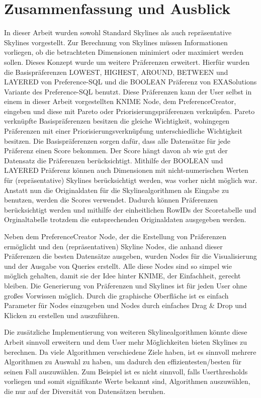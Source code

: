 \chapter{Zusammenfassung und Ausblick}
\label{ch:Zusammenfassung}
In dieser Arbeit wurden sowohl Standard Skylines als auch repräsentative Skylines vorgestellt. Zur Berechnung von Skylines müssen Informationen vorliegen, ob die betrachteten Dimensionen minimiert oder maximiert werden sollen. Dieses Konzept wurde um weitere Präferenzen erweitert. Hierfür wurden die Basispräferenzen LOWEST, HIGHEST, AROUND, BETWEEN und LAYERED von Preference-SQL und die BOOLEAN Präferenz von EXASolutions Variante des Preference-SQL benutzt. 
Diese Präferenzen kann der User selbst in einem in dieser Arbeit vorgestellten KNIME Node, dem PreferenceCreator, eingeben und diese mit Pareto oder Priorisierungspräferenzen verknüpfen. Pareto verknüpfte Basispräferenzen besitzen die gleiche Wichtigkeit, wohingegen Präferenzen mit einer Priorisierungsverknüpfung unterschiedliche Wichtigkeit besitzen. Die Basispräferenzen sorgen dafür, dass alle Datensätze für jede Präferenz einen Score bekommen. Der Score hängt davon ab wie gut der Datensatz die Präferenzen berücksichtigt. 
Mithilfe der BOOLEAN und LAYERED Präferenz können auch Dimensionen mit nicht-numerischen Werten für (repräsentative) Skylines berücksichtigt werden, was vorher nicht möglich war.  
Anstatt nun die Originaldaten für die Skylinealgorithmen als Eingabe zu benutzen, werden die Scores verwendet. Dadurch können Präferenzen berücksichtigt werden und mithilfe der einheitlichen RowIDs der Scoretabelle und Orginaltabelle trotzdem die entsprechenden Originaldaten ausgegeben werden. 

Neben dem PreferenceCreator Node, der die Erstellung von Präferenzen ermöglicht und den (repräsentativen) Skyline Nodes, die anhand dieser Präferenzen die besten Datensätze ausgeben, wurden Nodes für die Visualisierung und der Ausgabe von Queries erstellt. Alle diese Nodes sind so simpel wie möglich gehalten, damit sie der Idee hinter KNIME, der Einfachheit, gerecht bleiben. Die Generierung von Präferenzen und Skylines ist für jeden User ohne großes Vorwissen möglich. Durch die graphische Oberfläche ist es einfach Parameter für Nodes einzugeben und Nodes durch einfaches Drag \& Drop und Klicken zu erstellen und auszuführen.  

Die zusätzliche Implementierung von weiteren Skylinealgorithmen könnte diese Arbeit sinnvoll erweitern und dem User mehr Möglichkeiten bieten Skylines zu berechnen. Da viele Algorithmen verschiedene Ziele haben, ist es sinnvoll mehrere Algorithmen zu Auswahl zu haben, um dadurch den effizientesten/besten für seinen Fall auszuwählen. Zum Beispiel ist es nicht sinnvoll, falls Userthresholds vorliegen und somit signifikante Werte bekannt sind, Algorithmen auszuwählen, die nur auf der Diversität von Datensätzen beruhen. 


